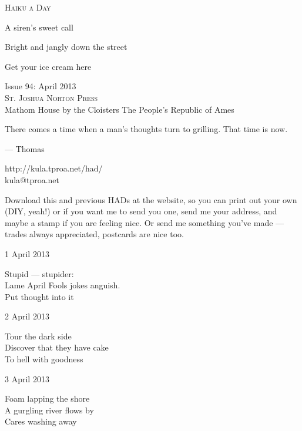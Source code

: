 \documentclass[12pt]{article}
\begin{document}
\begin{center}
{\fontsize{36}{48}\selectfont \textsc{Haiku a Day }}
\end{center}

\vspace*{3.5cm}

{\fontsize{20}{40}\selectfont 

A siren's sweet call

Bright and jangly down the street

Get your ice cream here


}

\vspace*{5.0cm}
\begin{center}
{\large{Issue 94: April 2013}} \\[5mm]
{\fontsize{8}{8}\selectfont  \textsc{ St. Joshua Norton Press }} \\[1mm]
{\fontsize{6}{6}\selectfont Mathom House by the Cloisters \textbar The People's Republic of Ames }
\end{center}


\newpage

There comes a time when a man's thoughts turn to grilling. That time is now.

--- Thomas

http://kula.tproa.net/had/ \\
kula@tproa.net

Download this and previous HADs at the website, so you can
print out your own (DIY, yeah!) or if you want me to send
you one, send me your address, and maybe a stamp if you
are feeling nice. Or send me something you've made ---
trades always appreciated, postcards are nice too.

\vfill

1 April 2013

Stupid --- stupider: \\
Lame April Fools jokes anguish. \\
Put thought into it

2 April 2013

Tour the dark side \\
Discover that they have cake \\
To hell with goodness

\newpage

3 April 2013

Foam lapping the shore \\
A gurgling river flows by \\
Cares washing away
\end{document}
